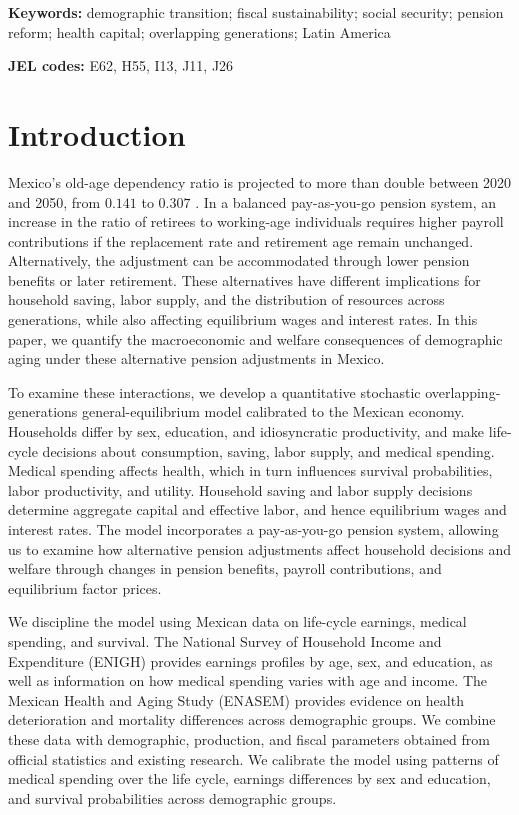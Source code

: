 \documentclass[12pt,a4paper]{article}
\begin{document}
\noindent\textbf{Keywords:} demographic transition; fiscal sustainability; social security; pension reform; health capital; overlapping generations; Latin America

\noindent\textbf{JEL codes:} E62, H55, I13, J11, J26



\section{Introduction}
\label{sec:intro}

Mexico's old-age dependency ratio is projected to more than double between 2020 and 2050, from $0.141$ to $0.307$ \citep{CONAPO2023}. In a balanced pay-as-you-go pension system, an increase in the ratio of retirees to working-age individuals requires higher payroll contributions if the replacement rate and retirement age remain unchanged. Alternatively, the adjustment can be accommodated through lower pension benefits or later retirement. These alternatives have different implications for household saving, labor supply, and the distribution of resources across generations, while also affecting equilibrium wages and interest rates. In this paper, we quantify the macroeconomic and welfare consequences of demographic aging under these alternative pension adjustments in Mexico.

To examine these interactions, we develop a quantitative stochastic overlapping-generations general-equilibrium model calibrated to the Mexican economy. Households differ by sex, education, and idiosyncratic productivity, and make life-cycle decisions about consumption, saving, labor supply, and medical spending. Medical spending affects health, which in turn influences survival probabilities, labor productivity, and utility. Household saving and labor supply decisions determine aggregate capital and effective labor, and hence equilibrium wages and interest rates. The model incorporates a pay-as-you-go pension system, allowing us to examine how alternative pension adjustments affect household decisions and welfare through changes in pension benefits, payroll contributions, and equilibrium factor prices.

We discipline the model using Mexican data on life-cycle earnings, medical spending, and survival. The National Survey of Household Income and Expenditure (ENIGH) provides earnings profiles by age, sex, and education, as well as information on how medical spending varies with age and income. The Mexican Health and Aging Study (ENASEM) provides evidence on health deterioration and mortality differences across demographic groups. We combine these data with demographic, production, and fiscal parameters obtained from official statistics and existing research. We calibrate the model using patterns of medical spending over the life cycle, earnings differences by sex and education, and survival probabilities across demographic groups.
\end{document}
